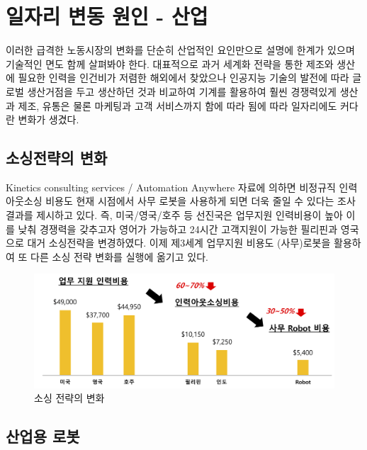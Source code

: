 \documentclass[smallextended]{svjour3}       %
\begin{document}
\hypertarget{automation-job-statistics}{%
\section{일자리 변동 원인 - 산업}\label{automation-job-statistics}}

이러한 급격한 노동시장의 변화를 단순히 산업적인 요인만으로 설명에 한계가
있으며 기술적인 면도 함께 살펴봐야 한다. 대표적으로 과거 세계화 전략을
통한 제조와 생산에 필요한 인력을 인건비가 저렴한 해외에서 찾았으나
인공지능 기술의 발전에 따라 글로벌 생산거점을 두고 생산하던 것과
비교하여 기계를 활용하여 훨씬 경쟁력있게 생산과 제조, 유통은 물론
마케팅과 고객 서비스까지 함에 따라 됨에 따라 일자리에도 커다란 변화가
생겼다.

\hypertarget{strategy-change}{%
\subsection{소싱전략의 변화}\label{strategy-change}}

Kinetics consulting services / Automation Anywhere 자료에 의하면
비정규직 인력아웃소싱 비용도 현재 시점에서 사무 로봇을 사용하게 되면
더욱 줄일 수 있다는 조사결과를 제시하고 있다. 즉, 미국/영국/호주 등
선진국은 업무지원 인력비용이 높아 이를 낮춰 경쟁력을 갖추고자 영어가
가능하고 24시간 고객지원이 가능한 필리핀과 영국으로 대거 소싱전략을
변경하였다. 이제 제3세계 업무지원 비용도 (사무)로봇을 활용하여 또 다른
소싱 전략 변화를 실행에 옮기고 있다.

\begin{figure}

{\centering \includegraphics[width=1\linewidth]{fig/the-end-of-outsourcing} 

}

\caption{소싱 전략의 변화}\label{fig:unnamed-chunk-3}
\end{figure}

\hypertarget{industrial-robot}{%
\subsection{산업용 로봇}\label{industrial-robot}}
\end{document}

